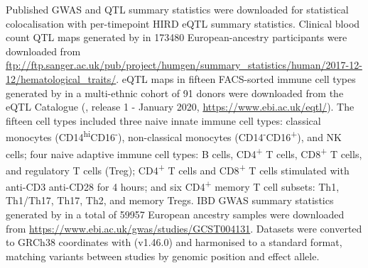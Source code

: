 Published \gls{GWAS} and \gls{QTL} summary statistics were downloaded for statistical colocalisation with per-timepoint \gls{HIRD} \gls{eQTL} summary statistics.
Clinical blood count \gls{QTL} maps generated by \textcite{astle2016AllelicLandscapeHuman} in \num{173480} European-ancestry participants were downloaded from \url{ftp://ftp.sanger.ac.uk/pub/project/humgen/summary_statistics/human/2017-12-12/hematological_traits/}.
\gls{eQTL} maps in fifteen \gls{FACS}-sorted immune cell types generated by \textcite{schmiedel2018ImpactGeneticPolymorphisms} in a multi-ethnic cohort of 91 donors were downloaded from the eQTL Catalogue (\autocite{kerimov2020EQTLCatalogueCompendium}, release 1 - January 2020, \url{https://www.ebi.ac.uk/eqtl/}).
The fifteen cell types included
three naive innate immune cell types: 
    classical monocytes (CD14\textsuperscript{hi}CD16\textsuperscript{-}),
    non-classical monocytes (CD14\textsuperscript{-}CD16\textsuperscript{+}),
    and \gls{NK} cells;
four naive adaptive immune cell types:
    B cells, CD4\textsuperscript{+} T cells, CD8\textsuperscript{+} T cells, and regulatory T cells (Treg);
CD4\textsuperscript{+} T cells and CD8\textsuperscript{+} T cells stimulated with anti-CD3 anti-CD28 for 4 hours;
and six CD4\textsuperscript{+} memory T cell subsets:
    Th1, Th1/Th17, Th17, Th2, and memory Tregs.
\Gls{IBD} \gls{GWAS} summary statistics generated by \textcite{delange2017GenomewideAssociationStudy} in a total of \num{59957} European ancestry samples were downloaded from \url{https://www.ebi.ac.uk/gwas/studies/GCST004131}.
Datasets were converted to GRCh38 coordinates with  (v1.46.0) \autocite{lawrence2009RtracklayerPackageInterfacing} and harmonised to a standard format, matching variants between studies by genomic position and effect allele.

